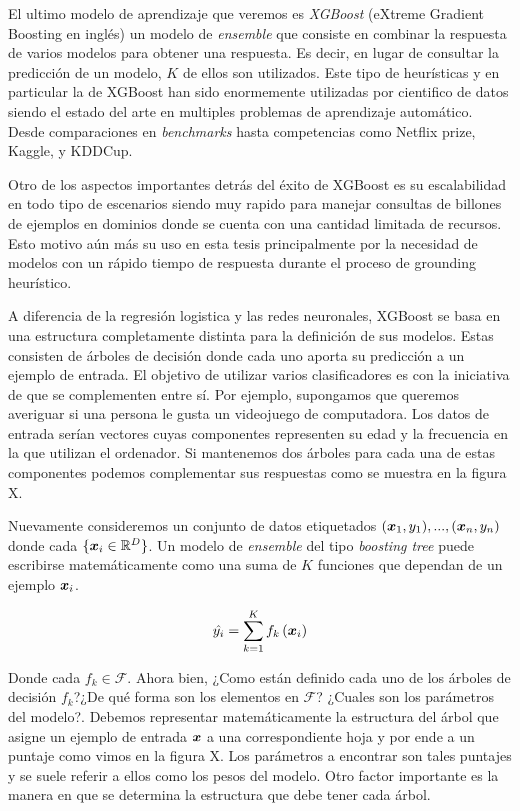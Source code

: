El ultimo modelo de aprendizaje que veremos es \emph{XGBoost} (eXtreme Gradient
Boosting en inglés) un modelo de \emph{ensemble} que consiste en combinar la
respuesta de varios modelos para obtener una respuesta. Es decir, en lugar de
consultar la predicción de un modelo, $K$ de ellos son utilizados. Este tipo de
heurísticas y en particular la de XGBoost han sido enormemente utilizadas por
cientifico de datos siendo el estado del arte en multiples problemas de
aprendizaje automático. Desde comparaciones en \emph{benchmarks} hasta
competencias como Netflix prize, Kaggle, y KDDCup.

Otro de los aspectos importantes detrás del éxito de XGBoost es su escalabilidad
en todo tipo de escenarios siendo muy rapido para manejar consultas de billones
de ejemplos en dominios donde se cuenta con una cantidad limitada de recursos.
Esto motivo aún más su uso en esta tesis principalmente por la necesidad de
modelos con un rápido tiempo de respuesta durante el proceso de grounding
heurístico.

A diferencia de la regresión logistica y las redes neuronales, XGBoost se basa
en una estructura completamente distinta para la definición de sus modelos.
Estas consisten de árboles de decisión donde cada uno aporta su predicción a un
ejemplo de entrada. El objetivo de utilizar varios clasificadores es con la
iniciativa de que se complementen entre sí. Por ejemplo, supongamos que queremos
averiguar si una persona le gusta un videojuego de computadora. Los datos de
entrada serían vectores cuyas componentes representen su edad y la frecuencia en
la que utilizan el ordenador. Si mantenemos dos árboles para cada una de estas
componentes podemos complementar sus respuestas como se muestra en la figura X.

Nuevamente consideremos un conjunto de datos etiquetados ${(\boldsymbol{x}_1, y_1),
..., (\boldsymbol{x}_n, y_n)}$ donde cada $\{\boldsymbol{x}_i \in \mathbb{R}^{D}\}$. Un
modelo de \emph{ensemble} del tipo \emph{boosting tree} puede escribirse
matemáticamente como una suma de $K$ funciones que dependan de un ejemplo
$\boldsymbol{x}_i$.

\begin{equation} \label{eq:xgb-model-1}
    \hat{y_{i}} = \sum_{k=1}^{K} f_{k} \left( \boldsymbol{x}_{i}\right)
\end{equation}

Donde cada $f_k \in \mathcal{F}$. Ahora bien, ¿Como están definido cada uno de
los árboles de decisión $f_k$?¿De qué forma son los elementos en $\mathcal{F}$?
¿Cuales son los parámetros del modelo?. Debemos representar matemáticamente la
estructura del árbol que asigne un ejemplo de entrada $\boldsymbol{x}$ a una
correspondiente hoja y por ende a un puntaje como vimos en la figura X. Los
parámetros a encontrar son tales puntajes y se suele referir a ellos como los
pesos del modelo. Otro factor importante es la manera en que se determina la
estructura que debe tener cada árbol.

